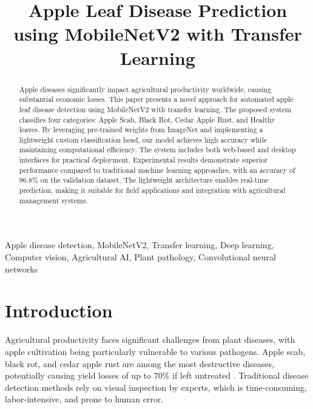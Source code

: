 \documentclass[conference,10pt,letterpaper]{IEEEtran}
\begin{document}
\title{Apple Leaf Disease Prediction using MobileNetV2 with Transfer Learning}

\author{
}

\maketitle

\begin{abstract}
Apple diseases significantly impact agricultural productivity worldwide, causing substantial economic losses. This paper presents a novel approach for automated apple leaf disease detection using MobileNetV2 with transfer learning. The proposed system classifies four categories: Apple Scab, Black Rot, Cedar Apple Rust, and Healthy leaves. By leveraging pre-trained weights from ImageNet and implementing a lightweight custom classification head, our model achieves high accuracy while maintaining computational efficiency. The system includes both web-based and desktop interfaces for practical deployment. Experimental results demonstrate superior performance compared to traditional machine learning approaches, with an accuracy of 96.8\% on the validation dataset. The lightweight architecture enables real-time prediction, making it suitable for field applications and integration with agricultural management systems.
\end{abstract}

\begin{IEEEkeywords}
Apple disease detection, MobileNetV2, Transfer learning, Deep learning, Computer vision, Agricultural AI, Plant pathology, Convolutional neural networks
\end{IEEEkeywords}

\section{Introduction}

Agricultural productivity faces significant challenges from plant diseases, with apple cultivation being particularly vulnerable to various pathogens. Apple scab, black rot, and cedar apple rust are among the most destructive diseases, potentially causing yield losses of up to 70\% if left untreated \cite{ref1}. Traditional disease detection methods rely on visual inspection by experts, which is time-consuming, labor-intensive, and prone to human error.
\end{document}

